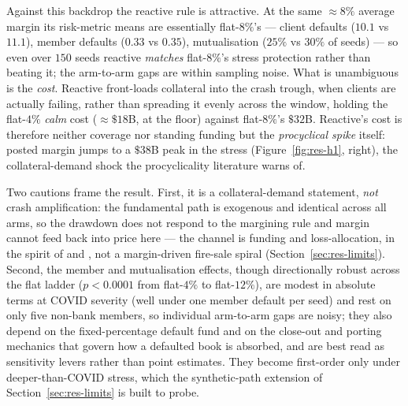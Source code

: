 Against this backdrop the reactive rule is attractive. At the same $\approx\!8\%$ average margin its
risk-metric means are essentially flat-$8\%$'s --- client defaults ($10.1$ vs $11.1$), member defaults
($0.33$ vs $0.35$), mutualisation ($25\%$ vs $30\%$ of seeds) --- so even over $150$ seeds reactive
\emph{matches} flat-$8\%$'s stress protection rather than beating it; the arm-to-arm gaps are within
sampling noise. What is unambiguous is the \emph{cost}. Reactive front-loads collateral into the crash
trough, when clients are actually failing, rather than spreading it evenly across the window, holding the
flat-$4\%$ \emph{calm} cost ($\approx\$18$B, at the floor) against flat-$8\%$'s $\$32$B. Reactive's cost is
therefore neither coverage nor standing funding but the \emph{procyclical spike} itself: posted margin jumps
to a $\$38$B peak in the stress (Figure~\ref{fig:res-h1}, right), the collateral-demand shock the
procyclicality literature warns of.

Two cautions frame the result. First, it is a collateral-demand statement, \emph{not} crash amplification:
the fundamental path is exogenous and identical across all arms, so the drawdown does not respond to the
margining rule and margin cannot feed back into price here --- the channel is funding and loss-allocation,
in the spirit of \citet{brunnermeier_pedersen_2009} and \citet{murphy_vasios_vause_2014}, not a margin-driven
fire-sale spiral (Section~\ref{sec:res-limits}). Second, the member and mutualisation effects, though
directionally robust across the flat ladder ($p<0.0001$ from flat-$4\%$ to flat-$12\%$), are modest in
absolute terms at COVID severity (well under one member default per seed) and rest on only five non-bank
members, so individual arm-to-arm gaps are noisy; they also depend on the fixed-percentage default fund and
on the close-out and porting mechanics that govern how a defaulted book is absorbed, and are best read as
sensitivity levers rather than point estimates. They become first-order only under deeper-than-COVID stress,
which the synthetic-path extension of Section~\ref{sec:res-limits} is built to probe.

